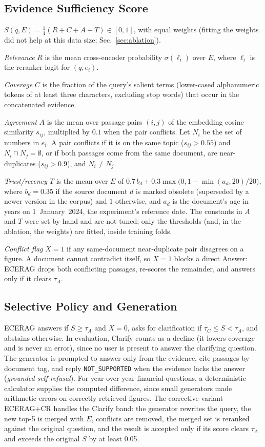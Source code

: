 \documentclass[conference,letterpaper]{IEEEtran}
\newcommand{\tA}{\tau_A}
\newcommand{\tC}{\tau_C}
\begin{document}
\subsection{Evidence Sufficiency Score}
$S(q,E)=\tfrac14(R+C+A+T)\in[0,1]$, with equal weights (fitting the weights did not help at this
data size; Sec.~\ref{sec:ablation}).

\emph{Relevance} $R$ is the mean cross-encoder probability $\sigma(\ell_i)$ over $E$, where
$\ell_i$ is the reranker logit for $(q,e_i)$.

\emph{Coverage} $C$ is the fraction of the query's salient terms (lower-cased alphanumeric tokens
of at least three characters, excluding stop words) that occur in the concatenated evidence.

\emph{Agreement} $A$ is the mean over passage pairs $(i,j)$ of the embedding cosine similarity
$s_{ij}$, multiplied by $0.1$ when the pair conflicts. Let $N_i$ be the set of numbers in $e_i$.
A pair conflicts if it is on the same topic ($s_{ij}>0.55$) and $N_i\cap N_j=\emptyset$, or if both
passages come from the same document, are near-duplicates ($s_{ij}>0.9$), and $N_i\neq N_j$.

\emph{Trust/recency} $T$ is the mean over $E$ of $0.7\,b_d+0.3\max\!\bigl(0,1-\min(a_d,20)/20\bigr)$,
where $b_d=0.35$ if the source document $d$ is marked obsolete (superseded by a newer version in
the corpus) and $1$ otherwise, and $a_d$ is the document's age in years on 1~January~2024, the
experiment's reference date. The constants in $A$ and $T$ were set by hand and are not tuned;
only the thresholds (and, in the ablation, the weights) are fitted, inside training folds.

\emph{Conflict flag} $X=1$ if any same-document near-duplicate pair disagrees on a figure. A
document cannot contradict itself, so $X=1$ blocks a direct Answer: ECERAG drops both conflicting
passages, re-scores the remainder, and answers only if it clears $\tA$.

\subsection{Selective Policy and Generation}
ECERAG answers if $S\ge\tA$ and $X=0$, asks for clarification if $\tC\le S<\tA$, and abstains
otherwise. In evaluation, Clarify counts as a decline (it lowers coverage and is never an error),
since no user is present to answer the clarifying question. The generator is prompted to answer only from the evidence, cite passages by document
tag, and reply \texttt{NOT\_SUPPORTED} when the evidence lacks the answer (\emph{grounded
self-refusal}). For year-over-year financial questions, a deterministic calculator supplies the
computed difference, since small generators made arithmetic errors on correctly retrieved
figures. The corrective variant ECERAG+CR handles the Clarify band: the generator rewrites the
query, the new top-5 is merged with $E$, conflicts are removed, the merged set is reranked
against the original question, and the result is accepted only if its score clears $\tA$ and
exceeds the original $S$ by at least 0.05.
\end{document}
